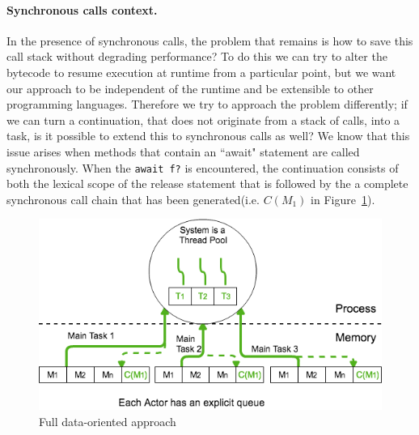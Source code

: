  

\paragraph{Synchronous calls context.}

In the presence of synchronous calls, the problem that remains is how to save this call stack without degrading performance? To do this we can try to alter the bytecode to resume execution at runtime from a particular point, but we want our approach to be independent of the runtime and be extensible to other programming languages. Therefore we try to approach the problem differently; if we can turn a continuation, that does not originate from a stack of calls, into a task, is it possible to extend this to synchronous calls as well? We know that this issue arises when methods that contain an ``await" statement are called synchronously. When the \texttt{await f?} is encountered, the continuation consists of both the lexical scope of the release statement that is followed by the a complete synchronous call chain that has been generated(i.e. $C(M_1)$ in Figure~\ref{sol}). 

\begin{figure}
	\centering
	\includegraphics[scale=0.45]{solution.png}
	\caption{Full data-oriented approach}
	\label{sol}
\end{figure}

